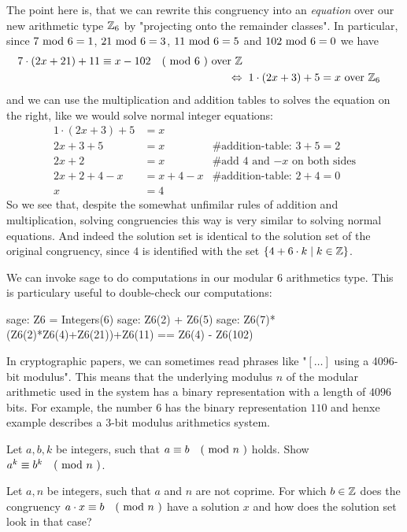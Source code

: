 \begin{example} 
The point here is, that we can rewrite this congruency into an \textit{equation} over our new arithmetic type $\mathbb{Z}_6$ by "projecting onto the remainder classes". In particular, since $7 \text{ mod } 6= 1$, $21 \text{ mod } 6= 3$, $11 \text{ mod } 6= 5$ and $102 \text{ mod } 6= 0$ we have
\begin{align*}
7\cdot(2x+21) + 11 \equiv x-102 \quad \text{( mod } 6 \text{ )} \text{ over } \mathbb{Z}\\ 
\Leftrightarrow & \; \; 1\cdot (2x+3) + 5 = x \text{ over } \mathbb{Z}_6
\end{align*}
and we can use the multiplication and addition tables to solves the equation on the right, like we would solve normal integer equations:
\begin{align*}
1\cdot (2x+3) + 5 &= x & \text{ }\\
2x+3 + 5 &= x & \text{\# addition-table: } 3+5 = 2 \\
2x+2 &= x & \text{\# add 4 and $-x$ on both sides} \\
2x+2 +4 -x &= x + 4 -x & \text{\# addition-table: } 2+4 = 0 \\
x &= 4 &
\end{align*}
So we see that, despite the somewhat unfimilar rules of addition and multiplication, solving congruencies this way is very similar to solving normal equations. And indeed the solution set is identical to the solution set of the original congruency, since $4$ is identified with the set $\{4+6\cdot k\;|\; k\in\mathbb{Z}\}$.

We can invoke sage to do computations in our modular $6$ arithmetics type. This is particulary useful to double-check our computations:
\begin{sagecommandline}
sage: Z6 = Integers(6)
sage: Z6(2) + Z6(5)
sage: Z6(7)*(Z6(2)*Z6(4)+Z6(21))+Z6(11) == Z6(4) - Z6(102)
\end{sagecommandline}
\end{example}

\begin{jargon} In cryptographic papers, we can sometimes read phrases like "$[\ldots]$ using a 4096-bit modulus". This means that the underlying modulus $n$ of the modular arithmetic used in the system has a binary representation with a length of $4096$ bits. For example, the number $6$ has the binary representation $110$ and henxe example describes a $3$-bit modulus arithmetics system.   
\end{jargon}
\begin{exercise}
Let $a,b,k$ be integers, such that $a \equiv b \quad \text{( mod } n \text{ )}$ holds. Show $a^k \equiv b^k \quad \text{( mod } n \text{ )}$.
\end{exercise}
\begin{exercise}
Let $a,n$ be integers, such that $a$ and $n$ are not coprime. For which $b\in\mathbb{Z}$ does the 
congruency $a\cdot x \equiv b \quad \text{( mod } n \text{ )}$ have a solution $x$ and how does the solution set look in that case?
\end{exercise}
